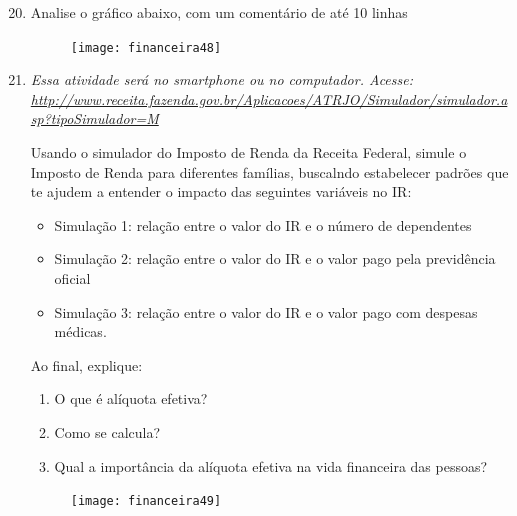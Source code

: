 \begin{enumerate}\setcounter{enumi}{19}
\item Analise o gráfico abaixo, com um comentário de até 10 linhas

\begin{figure}[H]
\centering

\texttt{[image: financeira48]}
\end{figure}

\item 
\textit{Essa atividade será no smartphone ou no computador. Acesse: \url{http://www.receita.fazenda.gov.br/Aplicacoes/ATRJO/Simulador/simulador.asp?tipoSimulador=M}}

Usando o simulador do Imposto de Renda da Receita Federal, simule o Imposto de Renda para diferentes famílias, buscalndo estabelecer padrões que te ajudem a entender o impacto das seguintes variáveis no IR:

  \begin{itemize}
  \item Simulação 1: relação entre o valor do IR e o número de dependentes
  \item Simulação 2: relação entre o valor do IR e o valor pago pela previdência oficial
  \item Simulação 3: relação entre o valor do IR e o valor pago com despesas médicas.
  \end{itemize}

Ao final, explique:
  \begin{enumerate}
    \item O que é alíquota efetiva?
    \item Como se calcula?
    \item Qual a importância da alíquota efetiva na vida financeira das pessoas?
  \end{enumerate}
\begin{figure}[H]
\centering

\texttt{[image: financeira49]}
\end{figure}
\end{enumerate}

